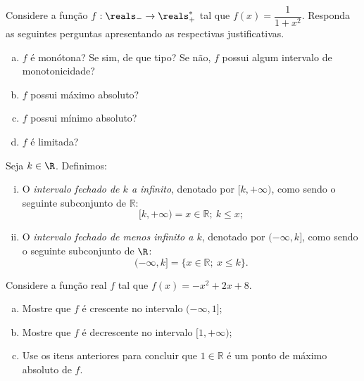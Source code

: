 \begin{exercise}
    Considere a função $f: \reals_- \to \reals^\ast_+$ tal que $f(x) = \dfrac{1}{1+x^2}$. Responda as seguintes perguntas apresentando as respectivas justificativas.
    \begin{enumerate}[a)]
	\item $f$ é monótona? Se sim, de que tipo? Se não, $f$ possui algum intervalo de monotonicidade?
	\item $f$ possui máximo absoluto?
	\item $f$ possui mínimo absoluto?
	\item $f$ é limitada?
    \end{enumerate}
\end{exercise}

\begin{exercise}
  Seja $k \in \R$. Definimos:
  \begin{enumerate}[i)]
    \item O \emph{intervalo fechado de $k$ a infinito}, denotado por $[k, + \infty)$, como sendo o seguinte subconjunto de $\mathbb R$: 
    $$ [k,+ \infty ) = { x \in \mathbb R ; \ k \leq x };$$
    \item O \emph{intervalo fechado de menos infinito a $k$}, denotado por $(- \infty, k ]$, como sendo o seguinte subconjunto de $\R$:
    $$ (- \infty, k ] = \{ x \in \mathbb R ; \  x \leq k \}.$$
  \end{enumerate}

  Considere a função real $f$ tal que $f(x) = -x^2 +2x +8$.
\begin{enumerate}[a)]
\item Mostre que $f$ é crescente no intervalo $( - \infty , 1]$;
\item Mostre que $f$ é decrescente no intervalo $[1, + \infty )$;
\item Use os itens anteriores para concluir que $1 \in \mathbb R$ é um ponto de máximo absoluto de $f$.
\end{enumerate}  
\end{exercise}

